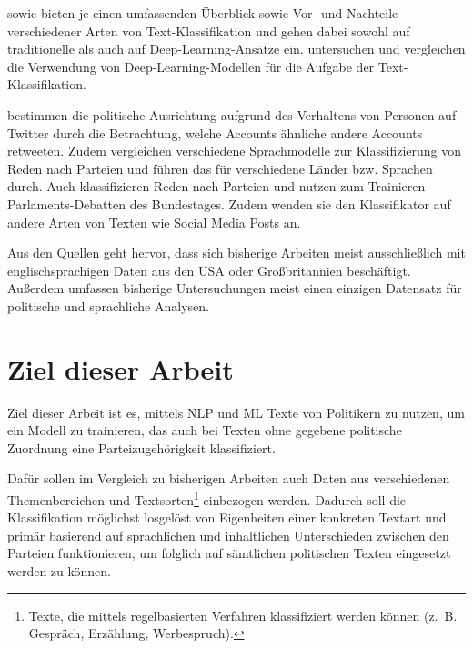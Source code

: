 \textcite{li_survey_2021} sowie \textcite{kowsari_text_2019} bieten je einen umfassenden Überblick sowie Vor- und Nachteile verschiedener Arten von Text-Klassifikation und gehen dabei sowohl auf traditionelle als auch auf Deep-Learning-Ansätze ein.
\textcite{minaee_deep_2022} untersuchen und vergleichen die Verwendung von Deep-Learning-Modellen für die Aufgabe der Text-Klassifikation.

\textcite{wong_quantifying_2016} bestimmen die politische Ausrichtung aufgrund des Verhaltens von Personen auf Twitter durch die Betrachtung, welche Accounts ähnliche andere Accounts retweeten.
Zudem vergleichen \textcite{doan_using_2022} verschiedene Sprachmodelle zur Klassifizierung von Reden nach Parteien und führen das für verschiedene Länder bzw. Sprachen durch.
Auch \textcite{biessmann_predicting_2016} klassifizieren Reden nach Parteien und nutzen zum Trainieren Parlaments-Debatten des Bundestages. Zudem wenden sie den Klassifikator auf andere Arten von Texten wie Social Media Posts an.

Aus den Quellen geht hervor, dass sich bisherige Arbeiten meist ausschließlich mit englischsprachigen Daten aus den USA oder Großbritannien beschäftigt. Außerdem umfassen bisherige Untersuchungen meist einen einzigen Datensatz für politische und sprachliche Analysen.

\section{Ziel dieser Arbeit} \label{sec:thesisGoal}


Ziel dieser Arbeit ist es, mittels \ac{NLP} und \ac{ML} Texte von Politikern zu nutzen, um ein Modell zu trainieren, das auch bei Texten ohne gegebene politische Zuordnung eine Parteizugehörigkeit klassifiziert. 


Dafür sollen im Vergleich zu bisherigen Arbeiten auch Daten aus verschiedenen Themenbereichen und Textsorten\footnote{Texte, die mittels regelbasierten Verfahren klassifiziert werden können (z. B. Gespräch, Erzählung, Werbespruch).} einbezogen werden. Dadurch soll die Klassifikation möglichst losgelöst von Eigenheiten einer konkreten Textart und primär basierend auf sprachlichen und inhaltlichen Unterschieden zwischen den Parteien funktionieren, um folglich auf sämtlichen politischen Texten eingesetzt werden zu können.


